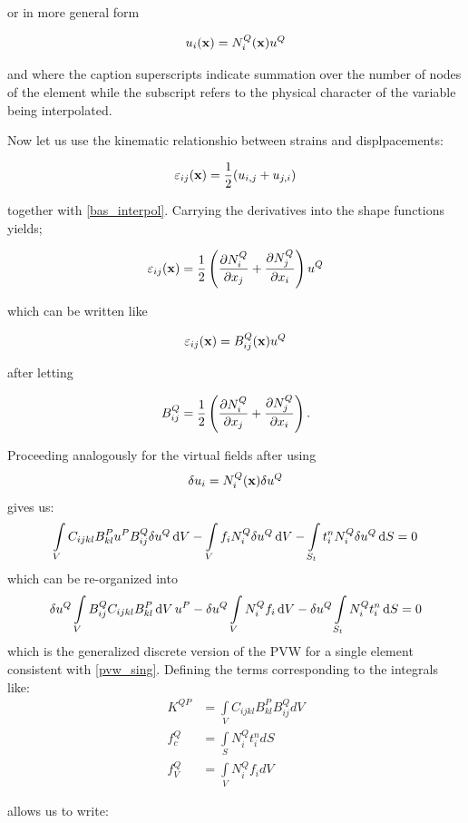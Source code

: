or in more general form

\begin{equation} \label{bas_interpol}
{u_i}(\vb x) = N_i^Q(\vb x){u^Q}
\end{equation}

and where the caption superscripts indicate summation over the number of nodes of the element while the subscript refers to the physical character of the variable being interpolated.

Now let us use the kinematic relationshio between strains and displpacements:

\[ \varepsilon_{ij}(\vb x) = \frac{1}{2}( u_{i,j} + u_{j,i} ) \]

together with \cref{bas_interpol}. Carrying the derivatives into the shape functions yields;

\[ \varepsilon_{ij}(\vb x) = \frac{1}{2}\left(\pdv{N_i^Q}{x_j} + \pdv{N_j^Q}{x_i} \right){u^Q} \]

which can be written like

\begin{equation}
\varepsilon_{ij}(\vb x) = B_{ij}^Q(\vb x){u^Q}
\label{str-dis}
\end{equation}

after letting

\[ B_{ij}^Q = \frac{1}{2}\left(\pdv{N_i^Q}{x_j} + \pdv{N_j^Q}{x_i} \right). \]

Proceeding analogously for the virtual fields after using
\[ \delta {u_i} = N_i^Q(\vb x)\delta {u^Q} \]
gives us:
\[ \int\limits_V C_{ijkl} B_{kl}^P u^P B_{ij}^Q\delta u^Q \dd{V} - \int\limits_V f_i N_i^Q\delta {u^Q}\dd{V}  - \int\limits_{S_t} t_i^n N_i^Q\delta {u^Q} \dd{S} = 0 \]
which can be re-organized into
\[ \delta {u^Q}\int\limits_V B_{ij}^Q C_{ijkl} B_{kl}^P\dd{V}{u^P} - \delta {u^Q}\int\limits_V N_i^Q{f_i}\dd{V}  - \delta {u^Q}\int\limits_{S_t} N_i^Qt_i^n\dd{S} = 0\]
which is the generalized discrete version of the PVW for a single element consistent with \cref{pvw_sing}. Defining the terms corresponding to the integrals like:
\begin{equation}
\begin{aligned}
{K^{QP}} & = \int\limits_V {{C_{ijkl}}B_{kl}^PB_{ij}^QdV} \\
f_c^Q    & = \int\limits_S {N_i^Qt_i^ndS} \\
f_V^Q    & = \int\limits_V {N_i^Q{f_i}dV}
\label{Rigi_3}
\end{aligned}
\end{equation}


allows us to write:


